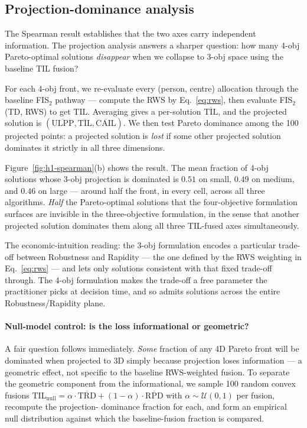 \documentclass[applsci,article,submit,moreauthors,pdftex]{Definitions/mdpi}
\begin{document}
\subsection{Projection-dominance analysis}\label{sec:h1-projection}

The Spearman result establishes that the two axes carry independent
information. The projection analysis answers a sharper question: how many
4-obj Pareto-optimal solutions \emph{disappear} when we collapse to 3-obj
space using the baseline TIL fusion?

For each 4-obj front, we re-evaluate every (person, centre) allocation
through the baseline FIS$_2$ pathway --- compute the RWS by
Eq.~\eqref{eq:rws}, then evaluate FIS$_2$(TD, RWS) to get TIL. Averaging
gives a per-solution $\overline{\mathrm{TIL}}$, and the projected solution
is $(\overline{\mathrm{ULPP}}, \overline{\mathrm{TIL}}, \overline{\mathrm{CAIL}})$.
We then test Pareto dominance among the 100 projected points: a projected
solution is \emph{lost} if some other projected solution dominates it
strictly in all three dimensions.

Figure~\ref{fig:h1-spearman}(b) shows the result. The mean fraction of
4-obj solutions whose 3-obj projection is dominated is $0.51$ on small,
$0.49$ on medium, and $0.46$ on large --- around half the front, in every
cell, across all three algorithms. \emph{Half} the Pareto-optimal solutions
that the four-objective formulation surfaces are invisible in the
three-objective formulation, in the sense that another projected solution
dominates them along all three TIL-fused axes simultaneously.

The economic-intuition reading: the 3-obj formulation encodes a particular
trade-off between Robustness and Rapidity --- the one defined by the RWS
weighting in Eq.~\eqref{eq:rws} --- and lets only solutions consistent with
that fixed trade-off through. The 4-obj formulation makes the trade-off a
free parameter the practitioner picks at decision time, and so admits
solutions across the entire Robustness/Rapidity plane.

\paragraph{Null-model control: is the loss informational or geometric?}
A fair question follows immediately. \emph{Some} fraction of any 4D
Pareto front will be dominated when projected to 3D simply because
projection loses information --- a geometric effect, not specific to the
baseline RWS-weighted fusion. To separate the geometric component from the
informational, we sample 100 random convex fusions
$\mathrm{TIL}_{\mathrm{null}} = \alpha \cdot \overline{\mathrm{TRD}}
+ (1-\alpha) \cdot \overline{\mathrm{RPD}}$ with
$\alpha \sim \mathcal{U}(0,1)$ per fusion, recompute the projection-
dominance fraction for each, and form an empirical null distribution
against which the baseline-fusion fraction is compared.
\end{document}
